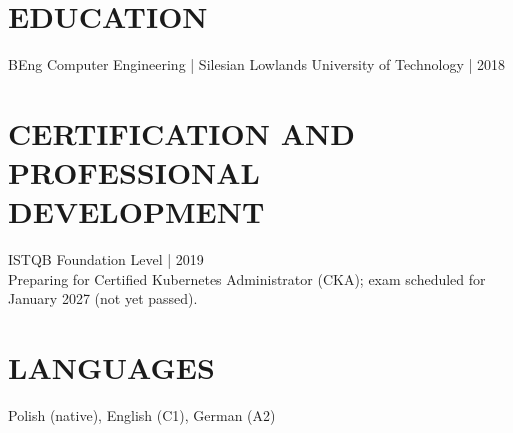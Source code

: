 \documentclass[11pt,a4paper]{article}
\begin{document}
\section*{EDUCATION}
BEng Computer Engineering | Silesian Lowlands University of Technology | 2018

\section*{CERTIFICATION AND PROFESSIONAL DEVELOPMENT}
ISTQB Foundation Level | 2019\\
Preparing for Certified Kubernetes Administrator (CKA); exam scheduled for January 2027 (not yet passed).

\section*{LANGUAGES}
Polish (native), English (C1), German (A2)
\end{document}
